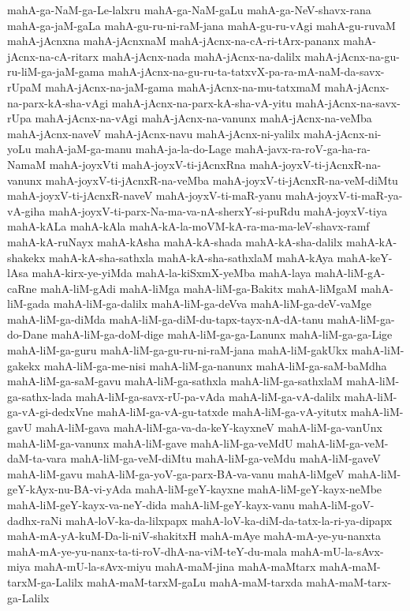 {mahA-ga-NaM-ga-Le-lalxru
mahA-ga-NaM-gaLu
mahA-ga-NeV-shavx-rana
mahA-ga-jaM-gaLa
mahA-gu-ru-ni-raM-jana
mahA-gu-ru-vAgi
mahA-gu-ruvaM
mahA-jAcnxna
mahA-jAcnxnaM
mahA-jAcnx-na-cA-ri-tArx-pananx
mahA-jAcnx-na-cA-ritarx
mahA-jAcnx-nada
mahA-jAcnx-na-dalilx
mahA-jAcnx-na-gu-ru-liM-ga-jaM-gama
mahA-jAcnx-na-gu-ru-ta-tatxvX-pa-ra-mA-naM-da-savx-rUpaM
mahA-jAcnx-na-jaM-gama
mahA-jAcnx-na-mu-tatxmaM
mahA-jAcnx-na-parx-kA-sha-vAgi
mahA-jAcnx-na-parx-kA-sha-vA-yitu
mahA-jAcnx-na-savx-rUpa
mahA-jAcnx-na-vAgi
mahA-jAcnx-na-vanunx
mahA-jAcnx-na-veMba
mahA-jAcnx-naveV
mahA-jAcnx-navu
mahA-jAcnx-ni-yalilx
mahA-jAcnx-ni-yoLu
mahA-jaM-ga-manu
mahA-ja-la-do-Lage
mahA-javx-ra-roV-ga-ha-ra-NamaM
mahA-joyxVti
mahA-joyxV-ti-jAcnxRna
mahA-joyxV-ti-jAcnxR-na-vanunx
mahA-joyxV-ti-jAcnxR-na-veMba
mahA-joyxV-ti-jAcnxR-na-veM-diMtu
mahA-joyxV-ti-jAcnxR-naveV
mahA-joyxV-ti-maR-yanu
mahA-joyxV-ti-maR-ya-vA-giha
mahA-joyxV-ti-parx-Na-ma-va-nA-sherxY-si-puRdu
mahA-joyxV-tiya
mahA-kALa
mahA-kAla
mahA-kA-la-moVM-kA-ra-ma-ma-leV-shavx-ramf
mahA-kA-ruNayx
mahA-kAsha
mahA-kA-shada
mahA-kA-sha-dalilx
mahA-kA-shakekx
mahA-kA-sha-sathxla
mahA-kA-sha-sathxlaM
mahA-kAya
mahA-keY-lAsa
mahA-kirx-ye-yiMda
mahA-la-kiSxmX-yeMba
mahA-laya
mahA-liM-gA-caRne
mahA-liM-gAdi
mahA-liMga
mahA-liM-ga-Bakitx
mahA-liMgaM
mahA-liM-gada
mahA-liM-ga-dalilx
mahA-liM-ga-deVva
mahA-liM-ga-deV-vaMge
mahA-liM-ga-diMda
mahA-liM-ga-diM-du-tapx-tayx-nA-dA-tanu
mahA-liM-ga-do-Dane
mahA-liM-ga-doM-dige
mahA-liM-ga-ga-Lanunx
mahA-liM-ga-ga-Lige
mahA-liM-ga-guru
mahA-liM-ga-gu-ru-ni-raM-jana
mahA-liM-gakUkx
mahA-liM-gakekx
mahA-liM-ga-me-nisi
mahA-liM-ga-nanunx
mahA-liM-ga-saM-baMdha
mahA-liM-ga-saM-gavu
mahA-liM-ga-sathxla
mahA-liM-ga-sathxlaM
mahA-liM-ga-sathx-lada
mahA-liM-ga-savx-rU-pa-vAda
mahA-liM-ga-vA-dalilx
mahA-liM-ga-vA-gi-dedxVne
mahA-liM-ga-vA-gu-tatxde
mahA-liM-ga-vA-yitutx
mahA-liM-gavU
mahA-liM-gava
mahA-liM-ga-va-da-keY-kayxneV
mahA-liM-ga-vanUnx
mahA-liM-ga-vanunx
mahA-liM-gave
mahA-liM-ga-veMdU
mahA-liM-ga-veM-daM-ta-vara
mahA-liM-ga-veM-diMtu
mahA-liM-ga-veMdu
mahA-liM-gaveV
mahA-liM-gavu
mahA-liM-ga-yoV-ga-parx-BA-va-vanu
mahA-liMgeV
mahA-liM-geY-kAyx-nu-BA-vi-yAda
mahA-liM-geY-kayxne
mahA-liM-geY-kayx-neMbe
mahA-liM-geY-kayx-va-neY-dida
mahA-liM-geY-kayx-vanu
mahA-liM-goV-dadhx-raNi
mahA-loV-ka-da-lilxpapx
mahA-loV-ka-diM-da-tatx-la-ri-ya-dipapx
mahA-mA-yA-kuM-Da-li-niV-shakitxH
mahA-mAye
mahA-mA-ye-yu-nanxta
mahA-mA-ye-yu-nanx-ta-ti-roV-dhA-na-viM-teY-du-mala
mahA-mU-la-sAvx-miya
mahA-mU-la-sAvx-miyu
mahA-maM-jina
mahA-maMtarx
mahA-maM-tarxM-ga-Lalilx
mahA-maM-tarxM-gaLu
mahA-maM-tarxda
mahA-maM-tarx-ga-Lalilx
}
